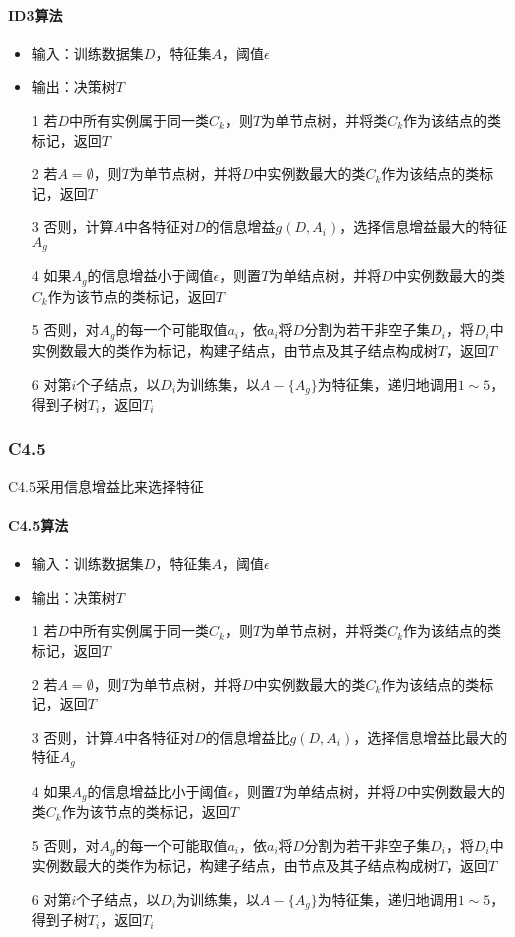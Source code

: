 \paragraph{ID3算法}
\begin{itemize}
\item 输入：训练数据集$D$，特征集$A$，阈值$\epsilon$
\item 输出：决策树$T$
\item[1] 若$D$中所有实例属于同一类$C_k$，则$T$为单节点树，并将类$C_k$作为该结点的类标记，返回$T$
\item[2] 若$A=\emptyset$，则$T$为单节点树，并将$D$中实例数最大的类$C_k$作为该结点的类标记，返回$T$
\item[3] 否则，计算$A$中各特征对$D$的信息增益$g(D,A_i)$，选择信息增益最大的特征$A_g$
\item[4] 如果$A_g$的信息增益小于阈值$\epsilon$，则置$T$为单结点树，并将$D$中实例数最大的类$C_k$作为该节点的类标记，返回$T$
\item[5] 否则，对$A_g$的每一个可能取值$a_i$，依$a_i$将$D$分割为若干非空子集$D_i$，将$D_i$中实例数最大的类作为标记，构建子结点，由节点及其子结点构成树$T$，返回$T$
\item[6] 对第$i$个子结点，以$D_i$为训练集，以$A-\{A_g\}$为特征集，递归地调用$1\sim 5$，得到子树$T_i$，返回$T_i$
\end{itemize}

\subsubsection{C4.5}
C4.5采用信息增益比来选择特征
\paragraph{C4.5算法}
\begin{itemize}
\item 输入：训练数据集$D$，特征集$A$，阈值$\epsilon$
\item 输出：决策树$T$
\item[1] 若$D$中所有实例属于同一类$C_k$，则$T$为单节点树，并将类$C_k$作为该结点的类标记，返回$T$
\item[2] 若$A=\emptyset$，则$T$为单节点树，并将$D$中实例数最大的类$C_k$作为该结点的类标记，返回$T$
\item[3] 否则，计算$A$中各特征对$D$的信息增益比$g(D,A_i)$，选择信息增益比最大的特征$A_g$
\item[4] 如果$A_g$的信息增益比小于阈值$\epsilon$，则置$T$为单结点树，并将$D$中实例数最大的类$C_k$作为该节点的类标记，返回$T$
\item[5] 否则，对$A_g$的每一个可能取值$a_i$，依$a_i$将$D$分割为若干非空子集$D_i$，将$D_i$中实例数最大的类作为标记，构建子结点，由节点及其子结点构成树$T$，返回$T$
\item[6] 对第$i$个子结点，以$D_i$为训练集，以$A-\{A_g\}$为特征集，递归地调用$1\sim 5$，得到子树$T_i$，返回$T_i$
\end{itemize}

